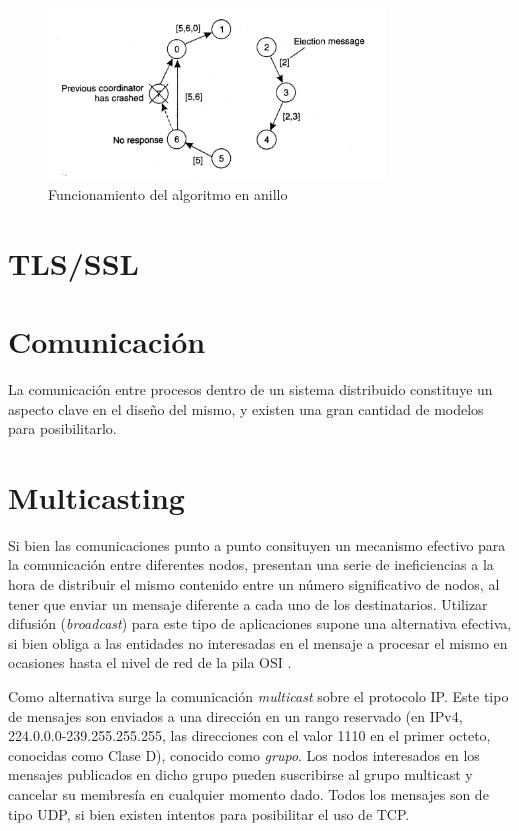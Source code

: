 \begin{figure}[H]
\centering
\includegraphics[width=0.8\textwidth]{Chapter2/Figures/ringalgorithm}
\caption{Funcionamiento del algoritmo en anillo}
\label{fig:tanenbaum:ringalgoritm}
\end{figure} 


\section{TLS/SSL}


\section{Comunicación}

La comunicación entre procesos dentro de un sistema distribuido constituye un aspecto clave en el diseño del mismo, y existen una gran cantidad de modelos para posibilitarlo.

\section{Multicasting}

Si bien las comunicaciones punto a punto consituyen un mecanismo efectivo para la comunicación entre diferentes nodos, presentan una serie de ineficiencias a la hora de distribuir el mismo contenido entre un número significativo de nodos, al tener que enviar un mensaje diferente a cada uno de los destinatarios. Utilizar difusión (\textit{broadcast}) para este tipo de aplicaciones supone una alternativa efectiva, si bien obliga a las entidades no interesadas en el mensaje a procesar el mismo en ocasiones hasta el nivel de red de la pila OSI \citationneeded.

Como alternativa surge la comunicación \textit{multicast} sobre el protocolo IP. Este tipo de mensajes son enviados a una dirección en un rango reservado (en IPv4, 224.0.0.0-239.255.255.255, las direcciones con el valor 1110 en el primer octeto, conocidas como Clase D), conocido como \textit{grupo}. Los nodos interesados en los mensajes publicados en dicho grupo pueden suscribirse al grupo multicast y cancelar su membresía en cualquier momento dado. Todos los mensajes son de tipo UDP, si bien existen intentos para posibilitar el uso de TCP\citationneeded.


